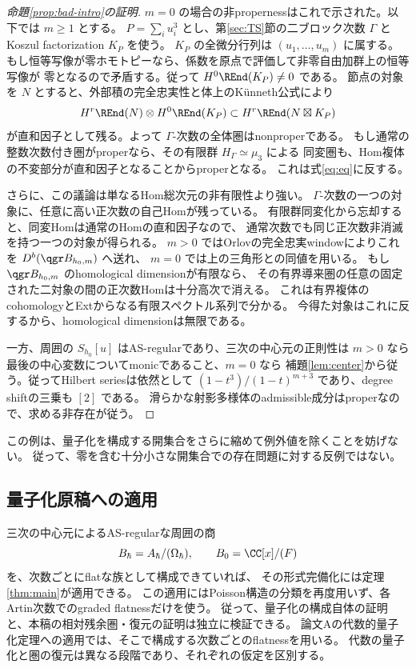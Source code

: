 \begin{proof}[命題\ref{prop:bad-intro}の証明]
 \(m=0\) の場合の非propernessはこれで示された。以下では \(m\ge1\) とする。
 \(P=\sum_i u_i^3\) とし、第\ref{sec:TS}節の二ブロック次数 \(\Gamma\) と
 Koszul factorization \(K_P\) を使う。
 \(K_P\) の全微分行列は \((u_1,\ldots,u_m)\) に属する。
 もし恒等写像が零ホモトピーなら、係数を原点で評価して非零自由加群上の恒等写像が
 零となるので矛盾する。従って \(H^0\REnd(K_P)\ne0\) である。
 節点の対象を \(N\) とすると、外部積の完全忠実性と体上のKünneth公式により
 \[
 H^r\REnd(N)\otimes H^0\REnd(K_P)
 \subset H^r\REnd(N\boxtimes K_P)
 \]
 が直和因子として残る。よって \(\Gamma\)-次数の全体圏はnonproperである。
 もし通常の整数次数付き圏がproperなら、その有限群 \(H_\Gamma\simeq\mu_3\) による
 同変圏も、Hom複体の不変部分が直和因子となることからproperとなる。
 これは式\eqref{eq:eq}に反する。

 さらに、この議論は単なるHom総次元の非有限性より強い。
 \(\Gamma\)-次数の一つの対象に、任意に高い正次数の自己Homが残っている。
 有限群同変化から忘却すると、同変Homは通常のHomの直和因子なので、
 通常次数でも同じ正次数非消滅を持つ一つの対象が得られる。
 \(m>0\) ではOrlovの完全忠実windowによりこれを \(D^b(\qgr B_{h_0,m})\) へ送れ、
 \(m=0\) では上の三角形との同値を用いる。
 もし \(\qgr B_{h_0,m}\) のhomological dimensionが有限なら、
 その有界導来圏の任意の固定された二対象の間の正次数Homは十分高次で消える。
 これは有界複体のcohomologyとExtからなる有限スペクトル系列で分かる。
 今得た対象はこれに反するから、homological dimensionは無限である。

 一方、周囲の \(S_{h_0}[u]\) はAS-regularであり、三次の中心元の正則性は
 \(m>0\) なら最後の中心変数についてmonicであること、\(m=0\) なら
 補題\ref{lem:center}から従う。従ってHilbert seriesは依然として
 \((1-t^3)/(1-t)^{m+3}\) であり、degree shiftの三乗も \([2]\) である。
 滑らかな射影多様体のadmissible成分はproperなので、求める非存在が従う。
\end{proof}

この例は、量子化を構成する開集合をさらに縮めて例外値を除くことを妨げない。
従って、零を含む十分小さな開集合での存在問題に対する反例ではない。

\subsection{量子化原稿への適用}

三次の中心元によるAS-regularな周囲の商
\[
 B_\hbar=A_\hbar/(\Omega_\hbar),\qquad B_0=\CC[x]/(F)
\]
を、次数ごとにflatな族として構成できていれば、
その形式完備化には定理\ref{thm:main}が適用できる。
この適用にはPoisson構造の分類を再度用いず、各Artin次数でのgraded flatnessだけを使う。
従って、量子化の構成自体の証明と、本稿の相対残余圏・復元の証明は独立に検証できる。
論文Aの代数的量子化定理への適用では、そこで構成する次数ごとのflatnessを用いる。
代数の量子化と圏の復元は異なる段階であり、それぞれの仮定を区別する。

